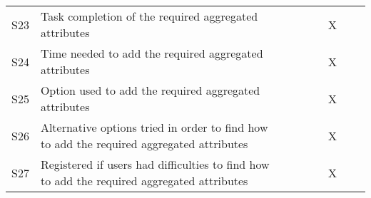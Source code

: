 \begin{longtable}{@{}lm{7cm}ccccccc@{}}
    S23         & Task completion of the required aggregated attributes                                                                                                   &                                                &                                                &                                                &                                                & X                                              &                                                &                                                \\
    S24         & Time needed to add the required aggregated attributes                                                                                                   &                                                &                                                &                                                &                                                & X                                              &                                                &                                                \\
    S25         & Option used to add the required aggregated attributes                                                                                                   &                                                &                                                &                                                &                                                & X                                              &                                                &                                                \\
    S26         & Alternative options tried in order to find how to add the required aggregated attributes                                                                &                                                &                                                &                                                &                                                & X                                              &                                                &                                                \\
    S27         & Registered if users had difficulties to find how to add the required aggregated attributes                                                              &                                                &                                                &                                                &                                                & X                                              &                                                &                                                \\

\end{longtable}
